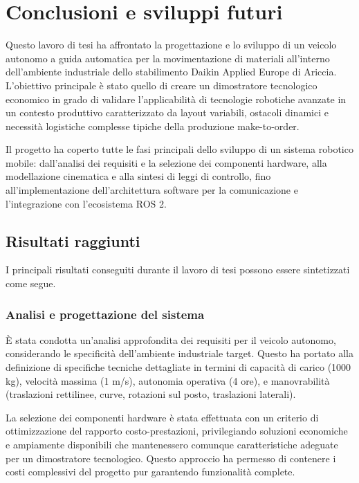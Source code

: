 \chapter{Conclusioni e sviluppi futuri}
\label{chap:conclusioni}

Questo lavoro di tesi ha affrontato la progettazione e lo sviluppo di un veicolo autonomo a guida automatica per la movimentazione di materiali all'interno dell'ambiente industriale dello stabilimento Daikin Applied Europe di Ariccia. L'obiettivo principale è stato quello di creare un dimostratore tecnologico economico in grado di validare l'applicabilità di tecnologie robotiche avanzate in un contesto produttivo caratterizzato da layout variabili, ostacoli dinamici e necessità logistiche complesse tipiche della produzione make-to-order.

Il progetto ha coperto tutte le fasi principali dello sviluppo di un sistema robotico mobile: dall'analisi dei requisiti e la selezione dei componenti hardware, alla modellazione cinematica e alla sintesi di leggi di controllo, fino all'implementazione dell'architettura software per la comunicazione e l'integrazione con l'ecosistema ROS 2.

\section{Risultati raggiunti}

I principali risultati conseguiti durante il lavoro di tesi possono essere sintetizzati come segue.

\subsection{Analisi e progettazione del sistema}

È stata condotta un'analisi approfondita dei requisiti per il veicolo autonomo, considerando le specificità dell'ambiente industriale target. Questo ha portato alla definizione di specifiche tecniche dettagliate in termini di capacità di carico (1000 kg), velocità massima (1 m/s), autonomia operativa (4 ore), e manovrabilità (traslazioni rettilinee, curve, rotazioni sul posto, traslazioni laterali).

La selezione dei componenti hardware è stata effettuata con un criterio di ottimizzazione del rapporto costo-prestazioni, privilegiando soluzioni economiche e ampiamente disponibili che mantenessero comunque caratteristiche adeguate per un dimostratore tecnologico. Questo approccio ha permesso di contenere i costi complessivi del progetto pur garantendo funzionalità complete.

